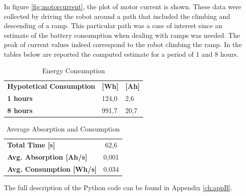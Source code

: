 In figure \ref{fig:motorcurrent}, the plot of motor current is shown. These data were collected by driving the robot around a path that included the climbing and descending of a ramp. This particular path was a case of interest since an estimate of the battery consumption when dealing with ramps was needed. The peak of current values indeed correspond to the robot climbing the ramp. In the tables below are reported the computed estimate for a period of 1 and 8 hours.
\begin{table}[H]
\centering
\begin{tabular}{lll}
\textbf{Hypotetical Consumption} & \textbf{{[}Wh{]}} & \textbf{{[}Ah{]}} \\
\textbf{1 hours}                 & 124,0             & 2,6               \\
\textbf{8 hours}                 & 991,7             & 20,7             
\end{tabular}
\caption{Energy Consumption}
\label{tab:consumption}
\end{table}

\begin{table}[H]
\centering
\begin{tabular}{lc}
\textbf{Total Time {[}s{]}}          & 62,6  \\
\textbf{Avg. Absorption {[}Ah/s{]}}  & 0,001 \\
\textbf{Avg. Consumption {[}Wh/s{]}} & 0,034
\end{tabular}
\caption{Average Absorption and Consumption}
\label{tab:my-table}
\end{table}

The full description of the Python code can be found in Appendix \ref{ch:appB}.